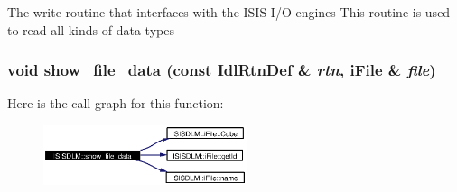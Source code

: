 The write routine that interfaces with the ISIS I/O engines This routine is used to read all kinds of data types 
\subsubsection{\setlength{\rightskip}{0pt plus 5cm}void show\_\-file\_\-data (const Idl\-Rtn\-Def \& {\em rtn}, i\-File \& {\em file})}\label{namespaceISISDLM_a22}




Here is the call graph for this function:\begin{figure}[H]
\begin{center}
\leavevmode
\includegraphics[width=169pt]{namespaceISISDLM_a22_cgraph}
\end{center}
\end{figure}

